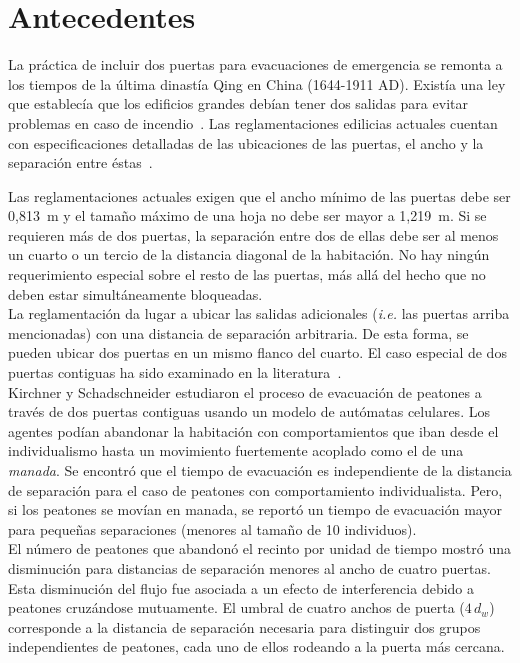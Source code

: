 \section{Antecedentes}

La práctica de incluir dos puertas para evacuaciones de emergencia se remonta a los tiempos de la última dinastía Qing en China (1644-1911 AD). Existía una ley que establecía que los edificios grandes debían tener dos salidas para evitar problemas en caso de incendio~\cite{cheng}.
Las reglamentaciones edilicias actuales cuentan con especificaciones detalladas de las ubicaciones de las puertas, el ancho y la separación entre éstas~\cite{OSHA,FLO}.
 
Las reglamentaciones actuales exigen que el ancho mínimo de las puertas debe ser 0,813~m y el tamaño máximo de una hoja no debe ser mayor a 1,219~m\cite{FLO,FLO2}. Si se requieren más de dos puertas, la separación entre dos de ellas debe ser al menos un cuarto o un tercio de la distancia diagonal de la habitación. No hay ningún requerimiento especial sobre el resto de las puertas, más allá del hecho que no deben estar simultáneamente bloqueadas\cite{FLO,FLO2}.\\

La reglamentación da lugar a ubicar las salidas adicionales (\emph{i.e.} las puertas arriba mencionadas) con una distancia de separación arbitraria. De esta forma, se pueden ubicar dos puertas en un mismo flanco del cuarto. El caso especial de dos puertas contiguas ha sido examinado en la literatura~\cite{kirchner1,perez1,daoliang1,huanhuan1}. \\

Kirchner y Schadschneider estudiaron el proceso de evacuación de peatones a través de dos puertas contiguas usando un modelo de autómatas celulares\cite{kirchner1}. Los agentes podían abandonar la habitación con comportamientos que iban desde el individualismo hasta un movimiento fuertemente acoplado como el de una \emph{manada}. Se encontró que el tiempo de evacuación es independiente de la distancia de separación para el caso de peatones con comportamiento individualista. Pero, si los peatones se movían en manada, se reportó un tiempo de evacuación mayor para pequeñas separaciones (menores al tamaño de 10 individuos).\\

El número de peatones que abandonó el recinto por unidad de tiempo mostró una disminución para distancias de separación menores al ancho de cuatro puertas\cite{perez1}. Esta disminución del flujo fue asociada a un efecto de interferencia debido a peatones cruzándose mutuamente. El umbral de cuatro anchos de puerta ($4\,d_w$) corresponde a la distancia de separación necesaria para distinguir dos  grupos independientes de peatones, cada uno de ellos rodeando a la puerta más cercana. \\

